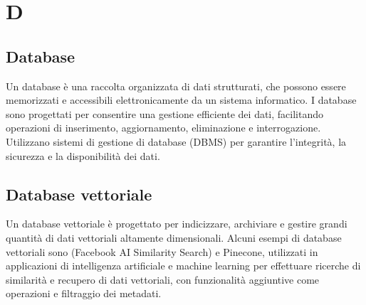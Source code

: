 \section{D}

\vspace{2em}
\subsection*{Database}
\par Un database è una raccolta organizzata di dati strutturati, che possono essere memorizzati e accessibili elettronicamente da un sistema informatico. I database sono progettati per consentire una gestione efficiente dei dati, facilitando operazioni di inserimento, aggiornamento, eliminazione e interrogazione. Utilizzano sistemi di gestione di database (DBMS) per garantire l'integrità, la sicurezza e la disponibilità dei dati.

\vspace{2em}
\subsection*{Database vettoriale}
\par Un database vettoriale è progettato per indicizzare, archiviare e gestire grandi quantità di dati vettoriali altamente dimensionali. Alcuni esempi di database vettoriali sono  (Facebook AI Similarity Search) e Pinecone, utilizzati in applicazioni di intelligenza artificiale e machine learning per effettuare ricerche di similarità e recupero di dati vettoriali, con funzionalità aggiuntive come operazioni  e filtraggio dei metadati.


